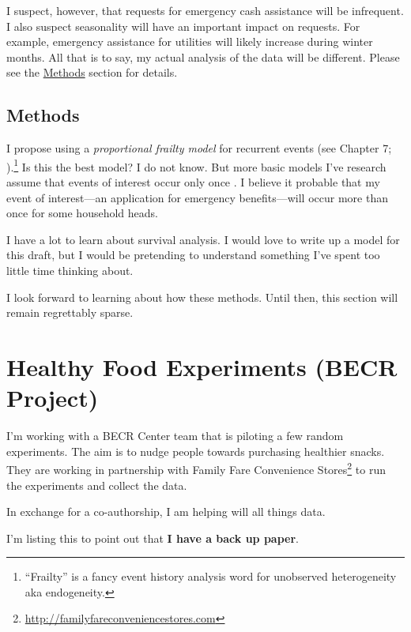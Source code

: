 \documentclass[12pt,letterpaperpaper,]{book}
\renewcommand{\href}[2]{#2\footnote{\url{#1}}}
\begin{document}
I suspect, however, that requests for emergency cash assistance will be
infrequent. I also suspect seasonality will have an important impact on
requests. For example, emergency assistance for utilities will likely
increase during winter months. All that is to say, my actual analysis of
the data will be different. Please see the
\protect\hyperlink{methods-3}{Methods} section for details.

\newpage

\hypertarget{methods-3}{\section*{Methods}\label{methods-3}}

I propose using a \emph{proportional frailty model} for recurrent events
(see Chapter 7; \citet{aalen_survival_2008}).\footnote{``Frailty'' is a
  fancy event history analysis word for unobserved heterogeneity aka
  endogeneity.} Is this the best model? I do not know. But more basic
models I've research assume that events of interest occur only once
\citep{singer_applied_2003}. I believe it probable that my event of
interest---an application for emergency benefits---will occur more than
once for some household heads.

I have a lot to learn about survival analysis. I would love to write up
a model for this draft, but I would be pretending to understand
something I've spent too little time thinking about.

I look forward to learning about how these methods. Until then, this
section will remain regrettably sparse.

\chapter{Healthy Food Experiments (BECR
Project)}\label{healthy-food-experiments-becr-project}

I'm working with a BECR Center team that is piloting a few random
experiments. The aim is to nudge people towards purchasing healthier
snacks. They are working in partnership with
\href{http://familyfareconveniencestores.com}{Family Fare Convenience
Stores} to run the experiments and collect the data.

In exchange for a co-authorship, I am helping will all things data.

I'm listing this to point out that \textbf{I have a back up paper}.



\backmatter
\printindex
\end{document}
